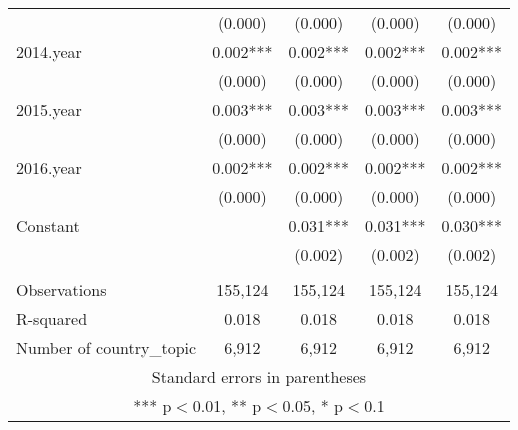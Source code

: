 \documentclass[]{article}
\begin{document}
\begin{tabular}{lcccc}
 & (0.000) & (0.000) & (0.000) & (0.000) \\
2014.year & 0.002*** & 0.002*** & 0.002*** & 0.002*** \\
 & (0.000) & (0.000) & (0.000) & (0.000) \\
2015.year & 0.003*** & 0.003*** & 0.003*** & 0.003*** \\
 & (0.000) & (0.000) & (0.000) & (0.000) \\
2016.year & 0.002*** & 0.002*** & 0.002*** & 0.002*** \\
 & (0.000) & (0.000) & (0.000) & (0.000) \\
Constant &  & 0.031*** & 0.031*** & 0.030*** \\
 &  & (0.002) & (0.002) & (0.002) \\
 &  &  &  &  \\
Observations & 155,124 & 155,124 & 155,124 & 155,124 \\
R-squared & 0.018 & 0.018 & 0.018 & 0.018 \\
 Number of country\_topic & 6,912 & 6,912 & 6,912 & 6,912 \\ \hline
\multicolumn{5}{c}{ Standard errors in parentheses} \\
\multicolumn{5}{c}{ *** p$<$0.01, ** p$<$0.05, * p$<$0.1} \\
\end{tabular}
\end{document}
